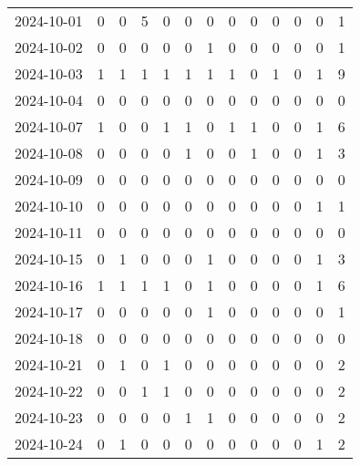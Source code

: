 \documentclass[dvipdfmx,oneside]{article}
\begin{document}
\begin{longtable}{lcccccccccccc}
        2024-10-01 &     0 &     0 &     5 &     0 &     0 &     0 &     0 &     0 &     0 &     0 &     0 &      1 \\
        2024-10-02 &     0 &     0 &     0 &     0 &     0 &     1 &     0 &     0 &     0 &     0 &     0 &      1 \\
        2024-10-03 &     1 &     1 &     1 &     1 &     1 &     1 &     1 &     0 &     1 &     0 &     1 &      9 \\
        2024-10-04 &     0 &     0 &     0 &     0 &     0 &     0 &     0 &     0 &     0 &     0 &     0 &      0 \\
        2024-10-07 &     1 &     0 &     0 &     1 &     1 &     0 &     1 &     1 &     0 &     0 &     1 &      6 \\
        2024-10-08 &     0 &     0 &     0 &     0 &     1 &     0 &     0 &     1 &     0 &     0 &     1 &      3 \\
        2024-10-09 &     0 &     0 &     0 &     0 &     0 &     0 &     0 &     0 &     0 &     0 &     0 &      0 \\
        2024-10-10 &     0 &     0 &     0 &     0 &     0 &     0 &     0 &     0 &     0 &     0 &     1 &      1 \\
        2024-10-11 &     0 &     0 &     0 &     0 &     0 &     0 &     0 &     0 &     0 &     0 &     0 &      0 \\
        2024-10-15 &     0 &     1 &     0 &     0 &     0 &     1 &     0 &     0 &     0 &     0 &     1 &      3 \\
        2024-10-16 &     1 &     1 &     1 &     1 &     0 &     1 &     0 &     0 &     0 &     0 &     1 &      6 \\
        2024-10-17 &     0 &     0 &     0 &     0 &     0 &     1 &     0 &     0 &     0 &     0 &     0 &      1 \\
        2024-10-18 &     0 &     0 &     0 &     0 &     0 &     0 &     0 &     0 &     0 &     0 &     0 &      0 \\
        2024-10-21 &     0 &     1 &     0 &     1 &     0 &     0 &     0 &     0 &     0 &     0 &     0 &      2 \\
        2024-10-22 &     0 &     0 &     1 &     1 &     0 &     0 &     0 &     0 &     0 &     0 &     0 &      2 \\
        2024-10-23 &     0 &     0 &     0 &     0 &     1 &     1 &     0 &     0 &     0 &     0 &     0 &      2 \\
        2024-10-24 &     0 &     1 &     0 &     0 &     0 &     0 &     0 &     0 &     0 &     0 &     1 &      2 \\

\end{longtable}
\end{document}

